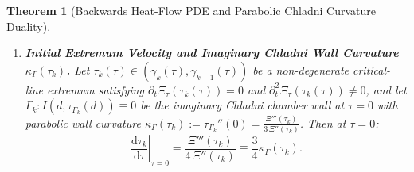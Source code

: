 \documentclass[11pt,reqno]{amsart}
\newtheorem{theorem}{Theorem}[section]
\theoremstyle{definition}
\theoremstyle{remark}
\numberwithin{equation}{section}
\newcommand{\dd}{\mathrm{d}}
\begin{document}
\begin{theorem}[Backwards Heat-Flow PDE and Parabolic Chladni Curvature Duality]
\begin{enumerate}[label=\textup{(\roman*)},leftmargin=2.2em]
\begin{equation}\label{eq:gamma_acceleration_duality}
\left.\frac{\dd^2\gamma_k}{\dd\tau^2}\right|_{\tau=0} = \frac{\Xi'''(\gamma_k)\,\kappa(\gamma_k)}{8\,\Xi'(\gamma_k)} - \frac{\Xi^{(4)}(\gamma_k)}{16\,\Xi'(\gamma_k)} - \frac{1}{16}\kappa(\gamma_k)^3 \equiv \frac{3}{2}c_{\mathrm{quart}}(\gamma_k) - \frac{\Xi'''(\gamma_k)\,\kappa(\gamma_k)}{4\,\Xi'(\gamma_k)} + \frac{1}{8}\kappa(\gamma_k)^3.
\end{equation}
\item \textbf{Initial Extremum Velocity and Imaginary Chladni Wall Curvature $\kappa_\Gamma(\tau_k)$.} Let $\tau_k(\tau) \in (\gamma_k(\tau), \gamma_{k+1}(\tau))$ be a non-degenerate critical-line extremum satisfying $\partial_t\Xi_\tau(\tau_k(\tau)) = 0$ and $\partial_t^2\Xi_\tau(\tau_k(\tau)) \neq 0$, and let $\Gamma_k : I(d, \tau_{\Gamma_k}(d)) \equiv 0$ be the imaginary Chladni chamber wall at $\tau = 0$ with parabolic wall curvature $\kappa_\Gamma(\tau_k) := \tau_{\Gamma_k}''(0) = \frac{\Xi'''(\tau_k)}{3\,\Xi''(\tau_k)}$. Then at $\tau = 0$:
\begin{equation}\label{eq:extremum_velocity_duality}
\left.\frac{\dd\tau_k}{\dd\tau}\right|_{\tau=0} = \frac{\Xi'''(\tau_k)}{4\,\Xi''(\tau_k)} \equiv \frac{3}{4}\kappa_\Gamma(\tau_k).
\end{equation}
\end{enumerate}
\end{theorem}
\end{document}
